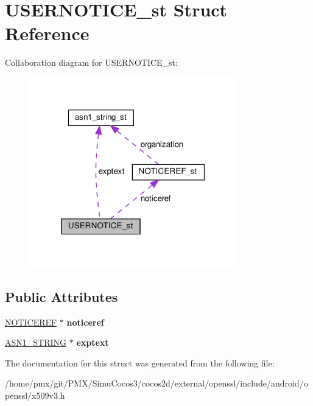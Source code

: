 \hypertarget{structUSERNOTICE__st}{}\section{U\+S\+E\+R\+N\+O\+T\+I\+C\+E\+\_\+st Struct Reference}
\label{structUSERNOTICE__st}


Collaboration diagram for U\+S\+E\+R\+N\+O\+T\+I\+C\+E\+\_\+st\+:
\nopagebreak
\begin{figure}[H]
\begin{center}
\leavevmode
\includegraphics[width=256pt]{structUSERNOTICE__st__coll__graph}
\end{center}
\end{figure}
\subsection*{Public Attributes}
\begin{DoxyCompactItemize}
\item 
\mbox{\label{structUSERNOTICE__st_adecc3c4e4f7bd4476b87be570733325d}} 
\hyperlink{structNOTICEREF__st}{N\+O\+T\+I\+C\+E\+R\+EF} $\ast$ {\bfseries noticeref}
\item 
\mbox{\label{structUSERNOTICE__st_a51665b065623b946d58953be4d8c7852}} 
\hyperlink{structasn1__string__st}{A\+S\+N1\+\_\+\+S\+T\+R\+I\+NG} $\ast$ {\bfseries exptext}
\end{DoxyCompactItemize}


The documentation for this struct was generated from the following file\+:\begin{DoxyCompactItemize}
\item 
/home/pmx/git/\+P\+M\+X/\+Simu\+Cocos3/cocos2d/external/openssl/include/android/openssl/x509v3.\+h\end{DoxyCompactItemize}
